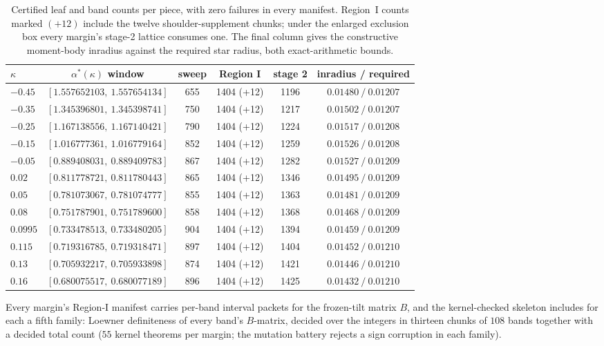 \begin{table}[h]
\centering
\small
\setlength{\tabcolsep}{4pt}
\begin{tabular}{lccccc}
\hline
$\kappa$ & $\alpha^*(\kappa)$ window & sweep & Region I & stage 2 &
inradius / required \\
\hline
$-0.45$ & $[1.557652103,\ 1.557654134]$ & 655 & 1404 (+12) & 1196 &
$0.01480\ /\ 0.01207$ \\
$-0.35$ & $[1.345396801,\ 1.345398741]$ & 750 & 1404 (+12) & 1217 &
$0.01502\ /\ 0.01207$ \\
$-0.25$ & $[1.167138556,\ 1.167140421]$ & 790 & 1404 (+12) & 1224 &
$0.01517\ /\ 0.01208$ \\
$-0.15$ & $[1.016777361,\ 1.016779164]$ & 852 & 1404 (+12) & 1259 &
$0.01526\ /\ 0.01208$ \\
$-0.05$ & $[0.889408031,\ 0.889409783]$ & 867 & 1404 (+12) & 1282 &
$0.01527\ /\ 0.01209$ \\
$0.02$  & $[0.811778721,\ 0.811780443]$ & 865 & 1404 (+12) & 1346 &
$0.01495\ /\ 0.01209$ \\
$0.05$  & $[0.781073067,\ 0.781074777]$ & 855 & 1404 (+12) & 1363 &
$0.01481\ /\ 0.01209$ \\
$0.08$  & $[0.751787901,\ 0.751789600]$ & 858 & 1404 (+12) & 1368 &
$0.01468\ /\ 0.01209$ \\
$0.0995$ & $[0.733478513,\ 0.733480205]$ & 904 & 1404 (+12) & 1394 &
$0.01459\ /\ 0.01209$ \\
$0.115$ & $[0.719316785,\ 0.719318471]$ & 897 & 1404 (+12) & 1404 &
$0.01452\ /\ 0.01210$ \\
$0.13$  & $[0.705932217,\ 0.705933898]$ & 874 & 1404 (+12) & 1421 &
$0.01446\ /\ 0.01210$ \\
$0.16$ & $[0.680075517,\ 0.680077189]$ & 896 & 1404 (+12) & 1425 &
$0.01432\ /\ 0.01210$ \\
\hline
\end{tabular}
\caption{Certified leaf and band counts per piece, with zero failures
in every manifest.  Region~I counts marked $(+12)$ include the twelve
shoulder-supplement chunks; under the enlarged exclusion box every
margin's stage-2 lattice consumes one.  The final column gives the
constructive moment-body inradius against the required star radius,
both exact-arithmetic bounds.}
\end{table}

Every margin's Region-I manifest carries per-band interval packets
for the frozen-tilt matrix $B$, and the kernel-checked skeleton
includes for each a fifth family: Loewner definiteness of every
band's $B$-matrix, decided over the integers in thirteen chunks of
$108$ bands together with a decided total count ($55$ kernel theorems
per margin; the mutation battery rejects a sign corruption in each
family).

